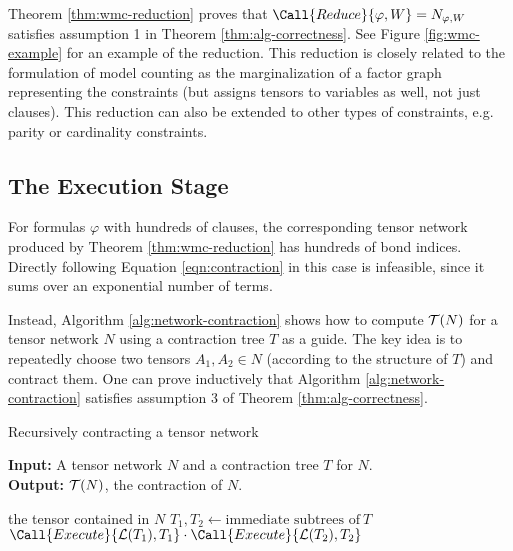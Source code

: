 Theorem \ref{thm:wmc-reduction} proves that $\Call{Reduce}{\varphi,W} = N_{\varphi, W}$ satisfies assumption 1 in Theorem \ref{thm:alg-correctness}. See Figure \ref{fig:wmc-example} for an example of the reduction. This reduction is closely related to the formulation of model counting as the marginalization of a factor graph representing the constraints (but assigns tensors to variables as well, not just clauses). %
This reduction can also be extended to other types of constraints, e.g. parity or cardinality constraints.

\subsection{The Execution Stage}
For formulas $\varphi$ with hundreds of clauses, the corresponding tensor network produced by Theorem \ref{thm:wmc-reduction} has hundreds of bond indices. Directly following Equation \ref{eqn:contraction} in this case is infeasible, since it sums over an exponential number of terms. 

Instead, Algorithm \ref{alg:network-contraction} shows how to compute $\mathcal{T}(N)$ for a tensor network $N$ using a contraction tree $T$ as a guide. The key idea is to repeatedly choose two tensors $A_1, A_2 \in N$ (according to the structure of $T$) and contract them. One can prove inductively that Algorithm \ref{alg:network-contraction} satisfies assumption 3 of Theorem \ref{thm:alg-correctness}.


\label{sec:algorithm:execution}
\begin{algorithm}[t]
	\caption{Recursively contracting a tensor network}\label{alg:network-contraction}
	\textbf{Input:} A tensor network $N$ and a contraction tree $T$ for $N$. \\
	\textbf{Output:} $\mathcal{T}(N)$, the contraction of $N$.
	\begin{algorithmic}[1]
		\State \Return the tensor contained in $N$
		\Else
        \State $T_1, T_2 \gets \text{immediate subtrees of}~T$
		\State \Return $\Call{Execute}{\Lv{T_1}, T_1} \cdot \Call{Execute}{\Lv{T_2}, T_2}$
		\EndIf
		\EndProcedure
	\end{algorithmic}
\end{algorithm}

